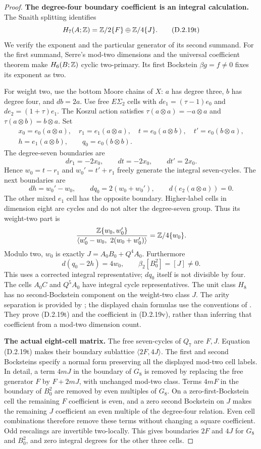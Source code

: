 \begin{proof}
\medskip\noindent
\textbf{The degree-four boundary coefficient is an integral calculation.}
The Snaith splitting identifies
\[
 H_7(A;\mathbb Z)=\mathbb Z/2\{F\}\oplus\mathbb Z/4\{J\}.
 \tag{D.2.19t}
\]
We verify the exponent and the particular generator of its
second summand. For the first summand, Serre's mod-two
dimensions and the universal coefficient theorem make
$H_6(B;\mathbb Z)$ cyclic two-primary. Its first Bockstein
$\beta g=f\ne0$ fixes its exponent as two.

For weight two, use the bottom Moore chains of $X$:
$a$ has degree three, $b$ has degree four, and $db=2a$.
Use free $E\Sigma_2$ cells with
$de_1=(\tau-1)e_0$ and $de_2=(1+\tau)e_1$.
The Koszul action satisfies
$\tau(a\otimes a)=-a\otimes a$ and
$\tau(a\otimes b)=b\otimes a$.
Set
\[
\begin{gathered}
 x_0=e_0(a\otimes a),\quad r_1=e_1(a\otimes a),\quad
 t=e_0(a\otimes b),\quad t'=e_0(b\otimes a),\\
 h=e_1(a\otimes b),\qquad q_0=e_0(b\otimes b).
\end{gathered}
\]
The degree-seven boundaries are
\[
 dr_1=-2x_0,\qquad dt=-2x_0,\qquad dt'=2x_0.
\]
Hence $w_0=t-r_1$ and $w_0'=t'+r_1$ freely generate
the integral seven-cycles. The next boundaries are
\[
 dh=w_0'-w_0,\qquad dq_0=2(w_0+w_0'),
 \qquad d(e_2(a\otimes a))=0.
 \tag{D.2.19u}
\]
The other mixed $e_1$ cell has the opposite boundary.
Higher-label cells in dimension eight are cycles and do
not alter the degree-seven group. Thus its weight-two part is
\[
 \frac{\mathbb Z\{w_0,w_0'\}}
      {\langle w_0'-w_0,\ 2(w_0+w_0')\rangle}
 =\mathbb Z/4\{w_0\}.
\]
Modulo two, $w_0$ is exactly $J=A_0B_0+Q^4A_0$.
Furthermore
\[
 d(q_0-2h)=4w_0,
 \qquad \beta_2[B_0^2]=[J]\ne0.
 \tag{D.2.19v}
\]
This uses a corrected integral representative; $dq_0$
itself is not divisible by four.
The cells $A_0C$ and $Q^5A_0$ have integral cycle
representatives. The unit class $H_8$ has no
second-Bockstein component on the weight-two class $J$.
The arity separation is provided by
\cite[Theorem~1.1 and \S2]{Snaith1974}; the displayed
chain formulas use the conventions of
\cite[Chapter~III, proof of Lemma~3.10, p.~232]{I_CohenLadaMay1976}.
They prove \textup{(D.2.19t)} and the coefficient in
\textup{(D.2.19v)}, rather than inferring that coefficient
from a mod-two dimension count.

\medskip\noindent
\textbf{The actual eight-cell matrix.}
The free seven-cycles of $Q_7$ are $F,J$. Equation
\textup{(D.2.19t)} makes their boundary sublattice
$\langle2F,4J\rangle$. The first and second Bocksteins
specify a normal form preserving all the displayed
mod-two cell labels. In detail, a term $4mJ$ in the
boundary of $G_8$ is removed by replacing the free
generator $F$ by $F+2mJ$, with unchanged mod-two class.
Terms $4mF$ in the boundary of $B_0^2$ are removed by
even multiples of $G_8$. On a zero-first-Bockstein
cell the remaining $F$ coefficient is even, and a
zero second Bockstein on $J$ makes the remaining
$J$ coefficient an even multiple of the degree-four
relation. Even cell combinations therefore remove
these terms without changing a square coefficient.
Odd rescalings are invertible two-locally. This gives
boundaries $2F$ and $4J$ for $G_8$ and $B_0^2$,
and zero integral degrees for the other three cells.


\end{proof}
